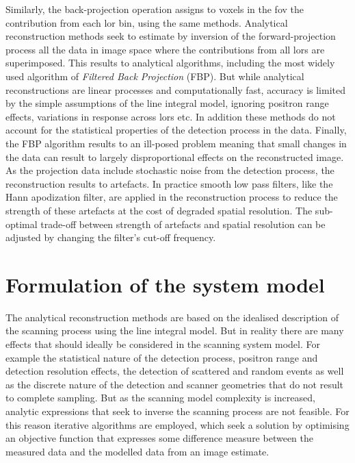 Similarly, the back-projection operation assigns to voxels in the \gls{fov} the contribution from each \gls{lor} bin, using the same methods.
Analytical reconstruction methods seek to estimate by inversion of the forward-projection process all the data in image space where the contributions from all \glspl{lor} are superimposed. 
This results to analytical algorithms, including the most widely used algorithm of \textit{Filtered Back Projection} (FBP).
But while analytical reconstructions are linear processes and computationally fast, accuracy is limited by the simple assumptions of the line integral model, ignoring positron range effects, variations in response across \glspl{lor} etc. In addition these methods do not account for the statistical properties of the detection process in the data.
Finally, the FBP algorithm results to an ill-posed problem meaning that small changes in the data can result to largely disproportional effects on the reconstructed image. As the projection data include stochastic noise from the detection process, the reconstruction results to artefacts. In practice smooth low pass filters, like the Hann apodization filter, are applied in the reconstruction process to reduce the strength of these artefacts at the cost of degraded spatial resolution. The sub-optimal trade-off between strength of artefacts and spatial resolution can be adjusted by changing the filter's cut-off frequency.

\section{Formulation of the system model}
The analytical reconstruction methods are based on the idealised description of the scanning process using the line integral model. But in reality there are many effects that should ideally be considered in the scanning system model. For example the statistical nature of the detection process, positron range and detection resolution effects, the detection of scattered and random events as well as the discrete nature of the detection and scanner geometries that do not result to complete sampling.
But as the scanning model complexity is increased, analytic expressions that seek to inverse the scanning process are not feasible.
For this reason iterative algorithms are employed, which seek a solution by optimising an objective function that expresses some difference measure between the measured data and the modelled data from an image estimate.

